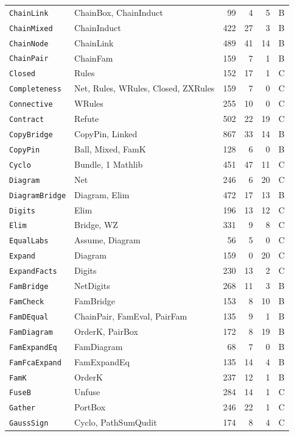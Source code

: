 {\begin{xltabular}{\textwidth}{@{}l>{\raggedright\arraybackslash}Xrrrc@{}}
\texttt{ChainLink} & ChainBox, ChainInduct & 99 & 4 & 5 & B \\
\texttt{ChainMixed} & ChainInduct & 422 & 27 & 3 & B \\
\texttt{ChainNode} & ChainLink & 489 & 41 & 14 & B \\
\texttt{ChainPair} & ChainFam & 159 & 7 & 1 & B \\
\texttt{Closed} & Rules & 152 & 17 & 1 & C \\
\texttt{Completeness} & Net, Rules, WRules, Closed, ZXRules & 159 & 7 & 0 & C \\
\texttt{Connective} & WRules & 255 & 10 & 0 & C \\
\texttt{Contract} & Refute & 502 & 22 & 19 & C \\
\texttt{CopyBridge} & CopyPin, Linked & 867 & 33 & 14 & B \\
\texttt{CopyPin} & Ball, Mixed, FamK & 128 & 6 & 0 & B \\
\texttt{Cyclo} & Bundle, 1 Mathlib & 451 & 47 & 11 & C \\
\texttt{Diagram} & Net & 246 & 6 & 20 & C \\
\texttt{DiagramBridge} & Diagram, Elim & 472 & 17 & 13 & B \\
\texttt{Digits} & Elim & 196 & 13 & 12 & C \\
\texttt{Elim} & Bridge, WZ & 331 & 9 & 8 & C \\
\texttt{EqualLabs} & Assume, Diagram & 56 & 5 & 0 & C \\
\texttt{Expand} & Diagram & 159 & 0 & 20 & C \\
\texttt{ExpandFacts} & Digits & 230 & 13 & 2 & C \\
\texttt{FamBridge} & NetDigits & 268 & 11 & 3 & B \\
\texttt{FamCheck} & FamBridge & 153 & 8 & 10 & B \\
\texttt{FamDEqual} & ChainPair, FamEval, PairFam & 135 & 9 & 1 & B \\
\texttt{FamDiagram} & OrderK, PairBox & 172 & 8 & 19 & B \\
\texttt{FamExpandEq} & FamDiagram & 68 & 7 & 0 & B \\
\texttt{FamFcaExpand} & FamExpandEq & 135 & 14 & 4 & B \\
\texttt{FamK} & OrderK & 237 & 12 & 1 & B \\
\texttt{FuseB} & Unfuse & 284 & 14 & 1 & C \\
\texttt{Gather} & PortBox & 246 & 22 & 1 & C \\
\texttt{GaussSign} & Cyclo, PathSumQudit & 174 & 8 & 4 & C \\

\end{xltabular}}
